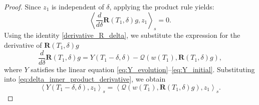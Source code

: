 \documentclass[10pt, reqno]{amsart}
\numberwithin{equation}{section}
\begin{document}
\begin{proof}
Since \( z_1 \) is independent of \( \delta \), applying the product rule yields:
\[
\left\langle \frac{d}{d\delta} \mathbf{R}(T_1, \delta)g, z_1 \right\rangle_s = 0.
\]
Using the identity \eqref{derivative_R_delta}, we substitute the expression for the derivative of \( \mathbf{R}(T_1, \delta)g \)
\[
\frac{d}{d\delta} \mathbf{R}(T_1, \delta)g = Y(T_1 - \delta, \delta) - \mathcal{Q}(w(T_1), \mathbf{R}(T_1, \delta)g),
\]
where \( Y \) satisfies the linear equation \eqref{eq:Y_evolution}–\eqref{eq:Y_initial}. Substituting into \eqref{eq:delta_inner_product_derivative}, we obtain
\begin{equation}\label{eq:derivative_identity}
	\left\langle Y(T_1 - \delta, \delta), z_1 \right\rangle_s = \left\langle \mathcal{Q}(w(T_1), \mathbf{R}(T_1, \delta)g), z_1 \right\rangle_s.
\end{equation}


\end{proof}
\end{document}
